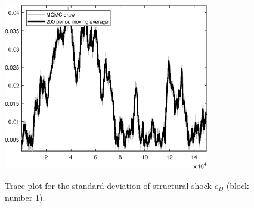 \begin{figure}[H]
\centering
  \includegraphics[width=0.8\textwidth]{BRS_gen/graphs/TracePlot_SE_e_D_blck_1}\\
    \caption{Trace plot for the standard deviation of structural shock ${e_D}$ (block number 1).}
\end{figure}
